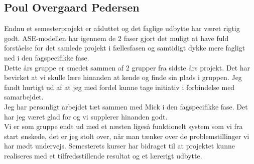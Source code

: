 \subsection*{Poul Overgaard Pedersen}

Endnu et semesterprojekt er afsluttet og det faglige udbytte har været rigtig godt. ASE-modellen har igennem de 2 faser gjort det muligt at have fuld forståelse for det samlede projekt i fællesfasen og samtidigt dykke mere fagligt ned i den fagspecifikke fase.\\

Dette års gruppe er smedet sammen af 2 grupper fra sidste års projekt. Det har bevirket at vi skulle lære hinanden at kende og finde sin plads i gruppen. Jeg fandt hurtigt ud af at jeg med fordel kunne tage initiativ i forbindelse med samarbejdet. \\

Jeg har personligt arbejdet tæt sammen med Mick i den fagspecifikke fase. Det har jeg været glad for og vi supplerer hinanden godt. \\

Vi er som gruppe endt ud med et næsten ligeså funktionelt system som vi fra start ønskede, det er jeg stolt over, når man tænker over de problemstillinger vi har mødt undervejs. Semesterets kurser har bidraget til at projektet kunne realiseres med et tilfredsstillende resultat og et lærerigt udbytte. \\